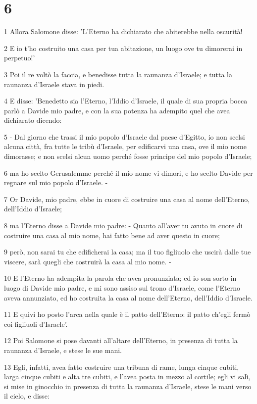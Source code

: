 \chapter{6}

\par 1 Allora Salomone disse: 'L'Eterno ha dichiarato che abiterebbe nella oscurità!
\par 2 E io t'ho costruito una casa per tua abitazione, un luogo ove tu dimorerai in perpetuo!'
\par 3 Poi il re voltò la faccia, e benedisse tutta la raunanza d'Israele; e tutta la raunanza d'Israele stava in piedi.
\par 4 E disse: 'Benedetto sia l'Eterno, l'Iddio d'Israele, il quale di sua propria bocca parlò a Davide mio padre, e con la sua potenza ha adempito quel che avea dichiarato dicendo:
\par 5 - Dal giorno che trassi il mio popolo d'Israele dal paese d'Egitto, io non scelsi alcuna città, fra tutte le tribù d'Israele, per edificarvi una casa, ove il mio nome dimorasse; e non scelsi alcun uomo perché fosse principe del mio popolo d'Israele;
\par 6 ma ho scelto Gerusalemme perché il mio nome vi dimori, e ho scelto Davide per regnare sul mio popolo d'Israele. -
\par 7 Or Davide, mio padre, ebbe in cuore di costruire una casa al nome dell'Eterno, dell'Iddio d'Israele;
\par 8 ma l'Eterno disse a Davide mio padre: - Quanto all'aver tu avuto in cuore di costruire una casa al mio nome, hai fatto bene ad aver questo in cuore;
\par 9 però, non sarai tu che edificherai la casa; ma il tuo figliuolo che uscirà dalle tue viscere, sarà quegli che costruirà la casa al mio nome. -
\par 10 E l'Eterno ha adempita la parola che avea pronunziata; ed io son sorto in luogo di Davide mio padre, e mi sono assiso sul trono d'Israele, come l'Eterno aveva annunziato, ed ho costruita la casa al nome dell'Eterno, dell'Iddio d'Israele.
\par 11 E quivi ho posto l'arca nella quale è il patto dell'Eterno: il patto ch'egli fermò coi figliuoli d'Israele'.
\par 12 Poi Salomone si pose davanti all'altare dell'Eterno, in presenza di tutta la raunanza d'Israele, e stese le sue mani.
\par 13 Egli, infatti, avea fatto costruire una tribuna di rame, lunga cinque cubiti, larga cinque cubiti e alta tre cubiti, e l'avea posta in mezzo al cortile; egli vi salì, si mise in ginocchio in presenza di tutta la raunanza d'Israele, stese le mani verso il cielo, e disse:
